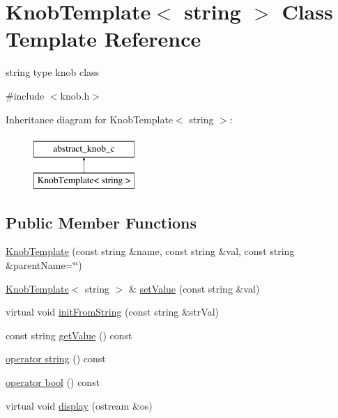\hypertarget{classKnobTemplate_3_01string_01_4}{
\section{KnobTemplate$<$ string $>$ Class Template Reference}
\label{classKnobTemplate_3_01string_01_4}
}


string type knob class  




{\ttfamily \#include $<$knob.h$>$}

Inheritance diagram for KnobTemplate$<$ string $>$:\begin{figure}[H]
\begin{center}
\leavevmode
\includegraphics[height=2.000000cm]{classKnobTemplate_3_01string_01_4}
\end{center}
\end{figure}
\subsection*{Public Member Functions}
\begin{DoxyCompactItemize}
\item 
\hyperlink{classKnobTemplate_3_01string_01_4_a6d71f31045ce02f191142d3fac09b96e}{KnobTemplate} (const string \&name, const string \&val, const string \&parentName=\char`\"{}\char`\"{})
\item 
\hyperlink{classKnobTemplate}{KnobTemplate}$<$ string $>$ \& \hyperlink{classKnobTemplate_3_01string_01_4_ae5810b244d49ed723f973d9cab1f608f}{setValue} (const string \&val)
\item 
virtual void \hyperlink{classKnobTemplate_3_01string_01_4_ae8fc9c5a7ed9be681b059083338902f7}{initFromString} (const string \&strVal)
\item 
const string \hyperlink{classKnobTemplate_3_01string_01_4_aeedbeeef8d6b8b4d7d8f7b230b714633}{getValue} () const 
\item 
\hyperlink{classKnobTemplate_3_01string_01_4_a702d6aa199956f7ce635da4069f1dbd9}{operator string} () const 
\item 
\hyperlink{classKnobTemplate_3_01string_01_4_ae578d85aaa47c81763db05dda5de61d5}{operator bool} () const 
\item 
virtual void \hyperlink{classKnobTemplate_3_01string_01_4_aee99cda916cd052abaf36957bf6e3a03}{display} (ostream \&os)
\end{DoxyCompactItemize}
